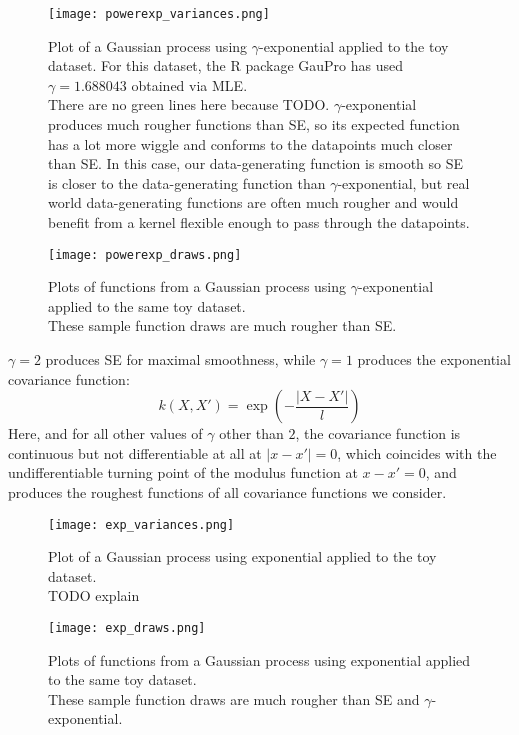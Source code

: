 \begin{figure}[H]
    \texttt{[image: powerexp\_variances.png]}
    \caption{
        Plot of a Gaussian process using $\gamma$-exponential applied to the toy dataset. For this dataset, the R package GauPro \cite{gaupro} has used $\gamma = 1.688043$ obtained via MLE. \\
        There are no green lines here because TODO. $\gamma$-exponential produces much rougher functions than SE, so its expected function has a lot more wiggle and conforms to the datapoints much closer than SE. In this case, our data-generating function is smooth so SE is closer to the data-generating function than $\gamma$-exponential, but real world data-generating functions are often much rougher and would benefit from a kernel flexible enough to pass through the datapoints.
    }
\end{figure}

\begin{figure}[H]
    \texttt{[image: powerexp\_draws.png]}
    \caption{
        Plots of functions from a Gaussian process using $\gamma$-exponential applied to the same toy dataset. \\
        These sample function draws are much rougher than SE.
    }
\end{figure}

$\gamma = 2$ produces SE for maximal smoothness, while $\gamma = 1$ produces the exponential covariance function:
\begin{equation*}
    k(X,X') = \exp \left(-\frac{|X - X'|}{l} \right)
\end{equation*}
Here, and for all other values of $\gamma$ other than $2$, the covariance function is continuous but not differentiable at all at $|x - x'| = 0$, which coincides with the undifferentiable turning point of the modulus function at $x - x' = 0$, and produces the roughest functions of all covariance functions we consider.

\begin{figure}[H]
    \texttt{[image: exp\_variances.png]}
    \caption{
        Plot of a Gaussian process using exponential applied to the toy dataset. \\
        TODO explain
    }
\end{figure}

\begin{figure}[H]
    \texttt{[image: exp\_draws.png]}
    \caption{
        Plots of functions from a Gaussian process using exponential applied to the same toy dataset. \\
        These sample function draws are much rougher than SE and $\gamma$-exponential.
    }
\end{figure}


